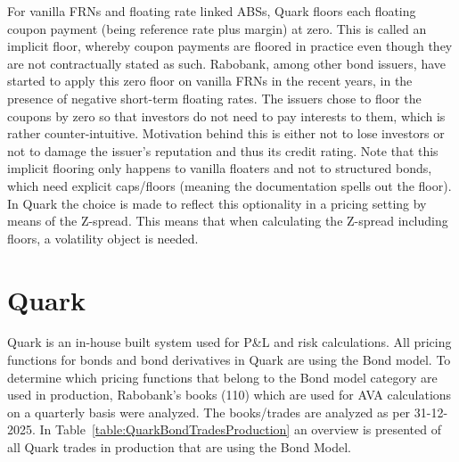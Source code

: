 \documentclass[reviewdoc]{pmv_report}  %
\begin{document}
For vanilla FRNs and floating rate linked ABSs, Quark floors each floating coupon payment
(being reference rate plus margin) at zero. This is called an implicit floor, whereby coupon payments
are floored in practice even though they are not contractually stated as such. Rabobank,
among other bond issuers, have started to apply this zero floor on vanilla FRNs in the recent
years, in the presence of negative short-term floating rates. The issuers chose to floor
the coupons by zero so that investors do not need to pay interests to them, which is rather
counter-intuitive. Motivation behind this is either not to lose investors or not to damage the
issuer's reputation and thus its credit rating. Note that this implicit flooring only happens to
vanilla floaters and not to structured bonds, which need explicit caps/floors (meaning the documentation
spells out the floor). In Quark the choice is made to reflect this optionality in a pricing setting by means of the Z-spread.
This means that when calculating the Z-spread including floors, a volatility object is
needed.

\section{Quark}\label{sec:Quark}
Quark is an in-house built system used for P\&L and risk calculations.
All pricing functions for bonds and bond derivatives in Quark are using the Bond model.
To determine which pricing functions that belong to the Bond model category are used in production, Rabobank's books (110) which are used for AVA calculations on a quarterly basis were analyzed.
The books/trades are analyzed as per 31-12-2025. In Table~\ref{table:QuarkBondTradesProduction} an overview is presented of all Quark trades in production that are using the Bond Model.
\end{document}
